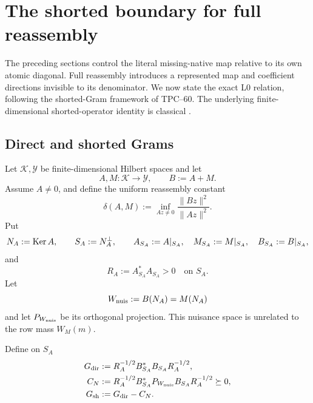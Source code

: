 \section{The shorted boundary for full reassembly}
\label{sec:tpc68-shorted-reassembly}

The preceding sections control the literal missing-native map relative to
its own atomic diagonal.  Full reassembly introduces a represented map and
coefficient directions invisible to its denominator.  We now state the
exact L0 relation, following the shorted-Gram framework of TPC--60.
The underlying finite-dimensional shorted-operator identity is classical
\citep{AndersonTrapp1975}.

\subsection{Direct and shorted Grams}

Let \(\mathcal K,\mathcal Y\) be finite-dimensional Hilbert spaces and let
\[
 A,M:\mathcal K\longrightarrow\mathcal Y,
 \qquad B:=A+M.
\]
Assume \(A\ne0\), and define the uniform reassembly constant
\begin{equation}
 \delta(A,M)
 :=
 \inf_{Az\ne0}\frac{\|Bz\|^2}{\|Az\|^2}.
 \label{eq:tpc68-delta-AM}
\end{equation}
Put
\[
 N_A:=\operatorname{Ker} A,\qquad S_A:=N_A^\perp,\qquad
 A_{S_A}:=A|_{S_A},\quad
 M_{S_A}:=M|_{S_A},\quad
 B_{S_A}:=B|_{S_A},
\]
and
\begin{equation}
 R_A:=A_{S_A}^*A_{S_A}>0\quad\text{on }S_A.
 \label{eq:tpc68-R-represented}
\end{equation}
Let
\begin{equation}
 W_{\rm nuis}:=B(N_A)=M(N_A)
 \label{eq:tpc68-W-nuis}
\end{equation}
and let \(P_{W_{\rm nuis}}\) be its orthogonal projection.  This nuisance
space is unrelated to the row mass \(W_M(m)\).

\begin{definition}
\label{def:tpc68-direct-shorted}
Define on \(S_A\)
\begin{align}
 G_{\rm dir}
 &:=
 R_A^{-1/2}B_{S_A}^*B_{S_A}R_A^{-1/2},
 \label{eq:tpc68-G-direct}\\
 C_N
 &:=
 R_A^{-1/2}B_{S_A}^*P_{W_{\rm nuis}}B_{S_A}R_A^{-1/2}\succeq0,
 \label{eq:tpc68-CN}\\
 G_{\rm sh}
 &:=
 G_{\rm dir}-C_N.
 \label{eq:tpc68-G-shorted}
\end{align}
\end{definition}

